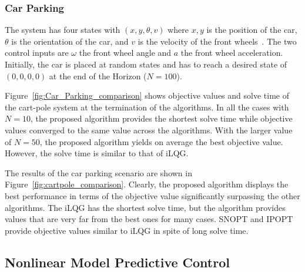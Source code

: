 
\subsubsection{Car Parking}

The system has four states with $(x,y,\theta,v)$ where $x,y$ is the position of the car, $\theta$ is the orientation of the car, and $v$ is the velocity of the front wheels~\cite{6907001}. The two control inputs are $\omega$ the front wheel angle and $a$ the front wheel acceleration. Initially, the car is placed at random states and has to reach a desired state of $(0,0,0,0)$ at the end of the Horizon ($N=100$). 

Figure~\ref{fig:Car_Parking_comparison} shows objective values and solve time of the cart-pole system at the termination of the algorithms. In all the cases with $N=10$, the proposed algorithm provides the shortest solve time while objective values converged to the same value across the algorithms. With the larger value of $N=50$, the proposed algorithm yields on average the best objective value. However, the solve time is similar to that of iLQG.

The results of the car parking scenario are shown in Figure~\ref{fig:cartpole_comparison}. Clearly, the proposed algorithm displays the best performance in terms of the objective value significantly surpassing the other algorithms. The iLQG has the shortest solve time, but the algorithm provides values that are very far from the best ones for many cases. SNOPT and IPOPT provide objective values similar to iLQG in spite of long solve time.   


\subsection{Nonlinear Model Predictive Control}


